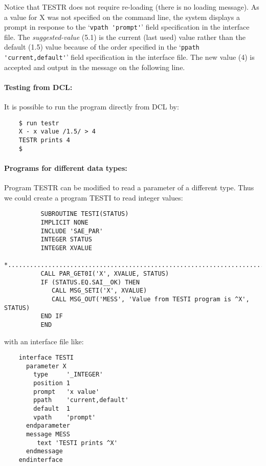 Notice that TESTR does not require re-loading (there is no loading
message).
As a value for X was not specified on the command line, the system displays a
prompt in response to the `\verb+vpath 'prompt'+' field specification in the
interface file.
The {\em suggested-value} (5.1) is the current (last used) value rather than the
default (1.5) value because of the order specified in the
`\verb+ppath 'current,default'+' field specification in the interface file.
The new value (4) is accepted and output in the message on the following line.

\paragraph{Testing from DCL:} \hfill

It is possible to run the program directly from DCL by:

\begin{small}
\begin{verbatim}
    $ run testr
    X - x value /1.5/ > 4
    TESTR prints 4
    $
\end{verbatim}
\end{small}

\paragraph{Programs for different data types:} \hfill

Program TESTR can be modified to read a parameter of a different type.
Thus we could create a program TESTI to read integer values:

\begin{small}
\begin{verbatim}
          SUBROUTINE TESTI(STATUS)
          IMPLICIT NONE
          INCLUDE 'SAE_PAR'
          INTEGER STATUS
          INTEGER XVALUE
    *...........................................................................
          CALL PAR_GET0I('X', XVALUE, STATUS)
          IF (STATUS.EQ.SAI__OK) THEN
             CALL MSG_SETI('X', XVALUE)
             CALL MSG_OUT('MESS', 'Value from TESTI program is ^X', STATUS)
          END IF
          END
\end{verbatim}
\end{small}

with an interface file like:

\begin{small}
\begin{verbatim}
    interface TESTI
      parameter X
        type     '_INTEGER'
        position 1
        prompt   'x value'
        ppath    'current,default'
        default  1
        vpath    'prompt'
      endparameter
      message MESS
         text 'TESTI prints ^X'
      endmessage
    endinterface
\end{verbatim}
\end{small}

